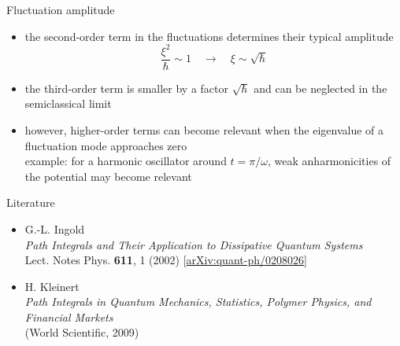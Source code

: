 \documentclass[t,dvipsnames]{beamer}
\begin{document}
\begin{frame}[c]{Fluctuation amplitude}
 \begin{itemize}
  \item the second-order term in the fluctuations determines their typical amplitude
	\begin{displaymath}
         \frac{\xi^2}{\hbar} \sim 1\quad \rightarrow\quad \xi \sim \sqrt{\hbar}
	\end{displaymath}
  \item the third-order term is smaller by a factor $\sqrt{\hbar}$ and can be neglected in the
	semiclassical limit
  \item however, higher-order terms can become relevant when the eigenvalue of a fluctuation
	  mode approaches zero\\[0.1truecm]
	example: for a harmonic oscillator around $t=\pi/\omega$, weak anharmonicities of
		 the potential may become relevant
 \end{itemize}
\end{frame}

\begin{frame}[c]{Literature}
 \begin{itemize}
  \item G.-L. Ingold\\
        \textit{Path Integrals and Their Application to Dissipative Quantum Systems}\\
        Lect.  Notes Phys. \textbf{611}, 1 (2002) [\url{arXiv:quant-ph/0208026}]
  \item H. Kleinert\\
	\textit{Path Integrals in Quantum Mechanics, Statistics, Polymer Physics, and Financial Markets}\\
	(World Scientific, 2009)
 \end{itemize}
\end{frame}
\end{document}
